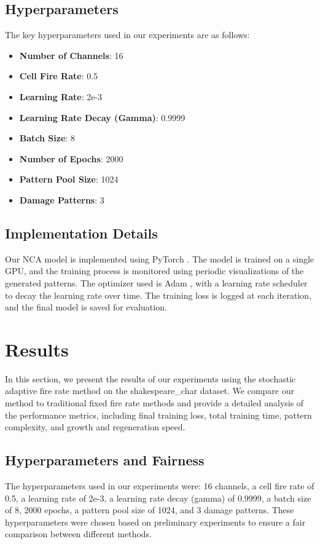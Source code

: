 \documentclass{article} %
\begin{document}
\subsection{Hyperparameters}
The key hyperparameters used in our experiments are as follows:
\begin{itemize}
    \item \textbf{Number of Channels}: 16
    \item \textbf{Cell Fire Rate}: 0.5
    \item \textbf{Learning Rate}: 2e-3
    \item \textbf{Learning Rate Decay (Gamma)}: 0.9999
    \item \textbf{Batch Size}: 8
    \item \textbf{Number of Epochs}: 2000
    \item \textbf{Pattern Pool Size}: 1024
    \item \textbf{Damage Patterns}: 3
\end{itemize}

\subsection{Implementation Details}
Our NCA model is implemented using PyTorch \citep{paszke2019pytorch}. The model is trained on a single GPU, and the training process is monitored using periodic visualizations of the generated patterns. The optimizer used is Adam \citep{kingma2014adam}, with a learning rate scheduler to decay the learning rate over time. The training loss is logged at each iteration, and the final model is saved for evaluation.

\section{Results}
\label{sec:results}

In this section, we present the results of our experiments using the stochastic adaptive fire rate method on the shakespeare\_char dataset. We compare our method to traditional fixed fire rate methods and provide a detailed analysis of the performance metrics, including final training loss, total training time, pattern complexity, and growth and regeneration speed.

\subsection{Hyperparameters and Fairness}
The hyperparameters used in our experiments were: 16 channels, a cell fire rate of 0.5, a learning rate of 2e-3, a learning rate decay (gamma) of 0.9999, a batch size of 8, 2000 epochs, a pattern pool size of 1024, and 3 damage patterns. These hyperparameters were chosen based on preliminary experiments to ensure a fair comparison between different methods.
\end{document}

